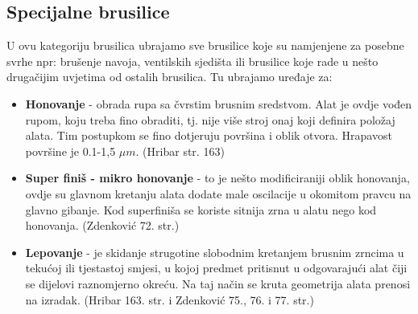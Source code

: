 \documentclass[a4paper,12pt]{article}
\numberwithin{figure}{section}
\begin{document}
\subsection{Specijalne brusilice}
U ovu kategoriju brusilica ubrajamo sve brusilice koje su namjenjene za posebne svrhe npr: brušenje navoja, ventilskih sjedišta ili brusilice koje rade u nešto drugačijim uvjetima od ostalih brusilica. Tu ubrajamo uređaje za:
\begin{itemize}
\item \textbf{Honovanje} - obrada rupa sa čvrstim brusnim sredstvom. Alat je ovdje vođen rupom, koju treba fino obraditi, tj. nije više stroj onaj koji definira položaj alata. Tim postupkom se fino dotjeruju površina i oblik otvora. Hrapavost površine je 0.1-1,5 $\mu m$. (Hribar str. 163)
\item \textbf{Super finiš - mikro honovanje} - to je nešto modificiraniji oblik honovanja, ovdje su glavnom kretanju alata dodate male oscilacije u okomitom pravcu na glavno gibanje. Kod superfiniša se koriste sitnija zrna u alatu nego kod honovanja. (Zdenković 72. str.)
\item \textbf{Lepovanje} - je skidanje strugotine slobodnim kretanjem brusnim zrncima u tekućoj ili tjestastoj smjesi, u kojoj predmet pritisnut u odgovarajući alat čiji se dijelovi raznomjerno okreću. Na taj način se kruta geometrija alata prenosi na izradak. (Hribar 163. str. i Zdenković 75., 76. i 77. str.)
\end{itemize}
\end{document}
